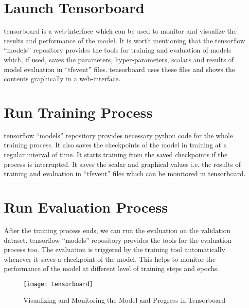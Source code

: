     \section{Launch Tensorboard}
        \gls{tensorboard} is a web-interface which can be used to monitor and visualize the results and performance of the model\cite{manetensorboard}. It is worth mentioning that the \gls{tensorflow} ``models'' repository provides the tools for training and evaluation of models which, if used, saves the parameters, hyper-parameters, scalars and results of model evaluation in ``tfevent'' files\cite{tf_models_repo}. \gls{tensorboard} uses these files and shows the contents graphically in a web-interface\cite{manetensorboard}.
        
    \section{Run Training Process}
        \gls{tensorflow} ``models'' repository provides necessary python code for the whole training process. It also saves the checkpoints of the model in training at a regular interval of time. It starts training from the saved checkpoints if the process is interrupted\cite{tf_models_repo}. It saves the scalar and graphical values i.e. the results of training and evaluation in ``tfevent'' files which can be monitored in \gls{tensorboard}.
        
    \section{Run Evaluation Process}
        After the training process ends, we can run the evaluation on the validation dataset. \gls{tensorflow} ``models'' repository provides the tools for the evaluation process too. The evaluation is triggered by the training tool automatically whenever it saves a checkpoint of the model\cite{tf_models_repo}. This helps to monitor the performance of the model at different level of training steps and epochs.
            
    \begin{figure}[h]
        \centering
        \texttt{[image: tensorboard]}
        \caption{Visualizing and Monitoring the Model and Progress in Tensorboard}
        \label{fig:tb_ui}
    \end{figure}
